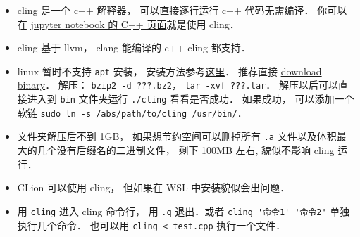 
\begin{issues}
\issueDraft
\end{issues}

\begin{itemize}
\item cling 是一个 c++ 解释器， 可以直接逐行运行 c++ 代码无需编译． 你可以在 \href{https://jupyter.org/try}{jupyter notebook 的 C++ 页面}就是使用 cling．
\item cling 基于 llvm， clang 能编译的 c++ cling 都支持．
\item linux 暂时不支持 \verb|apt| 安装， 安装方法参考\href{https://kaustubh13.medium.com/how-to-install-cling-on-linux-or-wsl-8125798ed9b9}{这里}． 推荐直接 \href{https://root.cern/download/cling/}{download binary}． 解压： \verb|bzip2 -d ???.bz2|， \verb|tar -xvf ???.tar|． 解压以后可以直接进入到 \verb|bin| 文件夹运行 \verb|./cling| 看看是否成功． 如果成功， 可以添加一个软链 \verb|sudo ln -s /abs/path/to/cling /usr/bin/|．
\item 文件夹解压后不到 1GB， 如果想节约空间可以删掉所有 \verb|.a| 文件以及体积最大的几个没有后缀名的二进制文件， 剩下 100MB 左右, 貌似不影响 cling 运行．
\item CLion 可以使用 cling， 但如果在 WSL 中安装貌似会出问题．
\item 用 \verb|cling| 进入 cling 命令行， 用 \verb|.q| 退出．或者 \verb|cling '命令1' '命令2'| 单独执行几个命令． 也可以用 \verb|cling < test.cpp| 执行一个文件．
\end{itemize}
